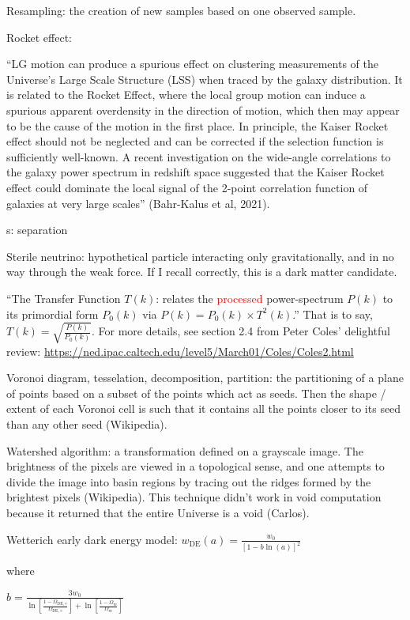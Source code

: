 \documentclass[11pt]{article}
\begin{document}
Resampling: the creation of new samples based on one observed sample.

Rocket effect:

``LG motion can produce a spurious effect on clustering measurements of the
Universe’s Large Scale Structure (LSS) when traced by the galaxy distribution.
It is related to the Rocket Effect, where the local group motion can induce a
spurious apparent overdensity in the direction of motion, which then may appear
to be the cause of the motion in the first place. In principle, the Kaiser
Rocket effect should not be neglected and can be corrected if the selection
function is sufficiently well-known. A recent investigation on the wide-angle
correlations to the galaxy power spectrum in redshift space suggested that the
Kaiser Rocket effect could dominate the local signal of the 2-point correlation
function of galaxies at very large scales'' (Bahr-Kalus et al, 2021).

s: separation

Sterile neutrino: hypothetical particle interacting only gravitationally, and
in no way through the weak force. If I recall correctly, this is a dark matter
candidate.

``The Transfer Function $T(k)$: relates the
\textcolor{red}{processed} power-spectrum $P(k)$ to
its primordial form $P_0(k)$ via $P(k) = P_0(k) \times T^2(k)$.'' That is to
say, $T(k) = \sqrt{\frac{P(k)}{P_0(k)}}$. For more details, see section 2.4
from Peter Coles' delightful review:
\url{https://ned.ipac.caltech.edu/level5/March01/Coles/Coles2.html}

Voronoi diagram, tesselation, decomposition, partition: the partitioning of a
plane of points based on a subset of the points which act as seeds. Then the
shape / extent of each Voronoi cell is such that it contains all the points
closer to its seed than any other seed (Wikipedia).

Watershed algorithm: a transformation defined on a grayscale image. The
brightness of the pixels are viewed in a topological sense, and one attempts
to divide the image into basin regions by tracing out the ridges formed by
the brightest pixels (Wikipedia). This technique didn't work in void
computation because it returned that the entire Universe is a void (Carlos).

Wetterich early dark energy model:
$w_\text{DE} (a) = \frac{w_0}{[1 - b \ln(a) ]^2}$

where

$
b = \frac{3w_0}{
\ln \left[ \frac{1 - \Omega_\text{DE, e}}{\Omega_\text{DE, e}} \right]
+
\ln \left[ \frac{1 - \Omega_m}{\Omega_m} \right]}
$
\end{document}
